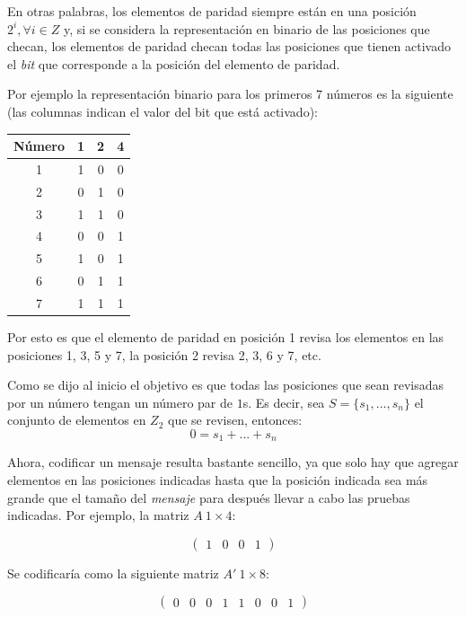 \documentclass{article}
\begin{document}
En otras palabras, los elementos de paridad siempre están en una posición $2^i, \forall i \in Z$ y, si se considera la representación en binario de las posiciones que checan, los elementos de paridad checan todas las posiciones que tienen activado el \textit{bit} que corresponde a la posición del elemento de paridad.

Por ejemplo la representación binario para los primeros 7 números es la siguiente (las columnas indican el valor del bit que está activado):

\begin{center}
    \begin{tabular}{|c||c|c|c|}
        \hline
        Número & 1 & 2 & 4 \\
        \hline
        1 & 1 & 0 & 0 \\
        2 & 0 & 1 & 0 \\
        3 & 1 & 1 & 0 \\
        4 & 0 & 0 & 1 \\
        5 & 1 & 0 & 1 \\
        6 & 0 & 1 & 1 \\
        7 & 1 & 1 & 1 \\
        \hline
    \end{tabular}
\end{center}

Por esto es que el elemento de paridad en posición 1 revisa los elementos en las posiciones 1, 3, 5 y 7, la posición 2 revisa 2, 3, 6 y 7, etc. 

Como se dijo al inicio el objetivo es que todas las posiciones que sean revisadas por un número tengan un número par de $1$s. Es decir, sea $S = \{ s_1, ..., s_n \}$ el conjunto de elementos en $Z_2$ que se revisen, entonces:
$$
0 = s_1 + ... + s_n
$$

Ahora, codificar un mensaje resulta bastante sencillo, ya que solo hay que agregar elementos en las posiciones indicadas hasta que la posición indicada sea más grande que el tamaño del \textit{mensaje} para después llevar a cabo las pruebas indicadas. Por ejemplo, la matriz $A\ 1 \times 4$:

$$
\begin{pmatrix}
    1 & 0 & 0 & 1
\end{pmatrix}
$$

Se codificaría como la siguiente matriz $A'\ 1 \times 8$:

$$
\begin{pmatrix}
    0 & 0 & 0 & 1 & 1 & 0 & 0 & 1
\end{pmatrix}
$$
\end{document}
